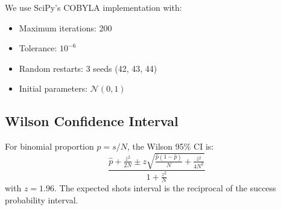 We use SciPy's COBYLA implementation with:
\begin{itemize}
\item Maximum iterations: 200
\item Tolerance: $10^{-6}$
\item Random restarts: 3 seeds (42, 43, 44)
\item Initial parameters: $\mathcal{N}(0, 1)$
\end{itemize}

\subsection{Wilson Confidence Interval}

For binomial proportion $p = s/N$, the Wilson 95\% CI is:
\begin{equation}
\frac{\hat{p} + \frac{z^2}{2N} \pm z \sqrt{\frac{\hat{p}(1-\hat{p})}{N} + \frac{z^2}{4N^2}}}{1 + \frac{z^2}{N}}
\end{equation}
with $z = 1.96$. The expected shots interval is the reciprocal of the success probability interval.
